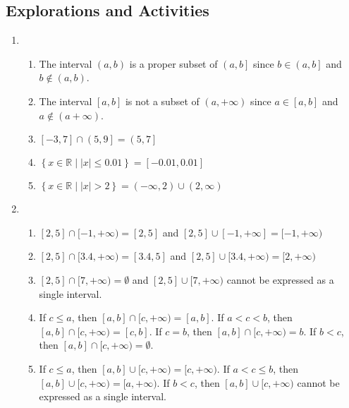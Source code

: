 \subsection*{Explorations and Activities}
\setcounter{oldenumi}{\theenumi}
\begin{enumerate} \setcounter{enumi}{\theoldenumi}
\item \begin{enumerate}
\item The interval $\left( {a, b} \right)$  is a proper subset of   $\left( {a, b} \right]$ since 
$ b \in \left( a, b \right]$ and $b \notin \left( a, b \right)$.

\item The interval $\left[ a, b \right]$ is not a subset of $\left( a, + \infty \right)$ since 
$a \in \left[ a, b \right]$ and $a \notin \left( a + \infty \right)$.

\item $\left[ -3, 7 \right] \cap \left( 5, 9 \right] = \left( 5, 7 \right]$

\item $\left\{ {x \in \mathbb{R}} \mid \left| x \right| \leq 0.01 \right\} = \left[ -0.01, 0.01 \right]$

\item $\left\{  x \in \mathbb{R} \mid \left| x \right| > 2 \right\} = \left( { - \infty , 2} \right) \cup \left( {2, \infty } \right)$
\end{enumerate}


\item \begin{enumerate}
\item $[2, 5] \cap [-1, +\infty) = [2, 5]$ and $[2, 5] \cup [-1, +\infty] = [-1, +\infty)$

\item $[2, 5] \cap [3.4, +\infty) = [3.4, 5]$ and $[2, 5] \cup [3.4, +\infty) = [2, +\infty)$

\item $[2, 5] \cap [7, +\infty) = \emptyset$ and $[2, 5] \cup [7, +\infty)$ cannot be expressed as a single interval.

\item If $c \leq a$, then $[a, b] \cap [c, +\infty) = [a, b]$. If $a < c < b$, then 
$[a, b] \cap [c, +\infty) = [c, b]$.  If $c = b$, then $[a, b] \cap [c, +\infty) = {b}$.  If 
$b < c$, then $[a, b] \cap [c, +\infty) = \emptyset$.

\item If $c \leq a$, then $[a, b] \cup [c, +\infty) = [c, +\infty)$. If $a < c \leq b$, then 
$[a, b] \cup [c, +\infty) = [a, +\infty)$.  If $b < c$, then $[a, b] \cup [c, +\infty)$ cannot be expressed as a single interval.
\end{enumerate}




\end{enumerate}
